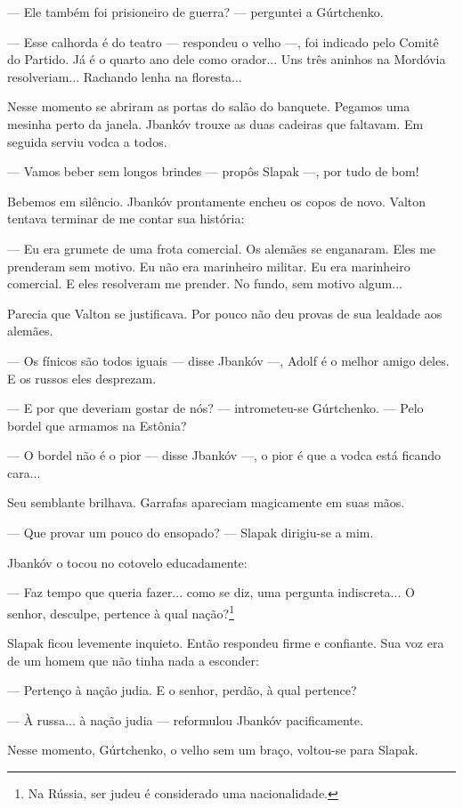 --- Ele também foi prisioneiro de guerra? --- perguntei a Gúrtchenko.

--- Esse calhorda é do teatro --- respondeu o velho ---, foi indicado
pelo Comitê do Partido. Já é o quarto ano dele como orador... Uns três
aninhos na Mordóvia resolveriam... Rachando lenha na floresta...

Nesse momento se abriram as portas do salão do banquete. Pegamos uma
mesinha perto da janela. Jbankóv trouxe as duas cadeiras que faltavam.
Em seguida serviu vodca a todos.

--- Vamos beber sem longos brindes --- propôs Slapak ---, por tudo de
bom!

Bebemos em silêncio. Jbankóv prontamente encheu os copos de novo. Valton
tentava terminar de me contar sua história:

--- Eu era grumete de uma frota comercial. Os alemães se enganaram. Eles
me prenderam sem motivo. Eu não era marinheiro militar. Eu era
marinheiro comercial. E eles resolveram me prender. No fundo, sem motivo
algum...

Parecia que Valton se justificava. Por pouco não deu provas de sua
lealdade aos alemães.

--- Os fínicos são todos iguais --- disse Jbankóv ---, Adolf é o melhor
amigo deles. E os russos eles desprezam.

--- E por que deveriam gostar de nós? --- intrometeu-se Gúrtchenko. ---
Pelo bordel que armamos na Estônia?

--- O bordel não é o pior --- disse Jbankóv ---, o pior é que a vodca
está ficando cara...

Seu semblante brilhava. Garrafas apareciam magicamente em suas mãos.

--- Que provar um pouco do ensopado? --- Slapak dirigiu-se a mim.

Jbankóv o tocou no cotovelo educadamente:

--- Faz tempo que queria fazer... como se diz, uma pergunta
indiscreta... O senhor, desculpe, pertence à qual nação?\footnote{Na
  Rússia, ser judeu é considerado uma nacionalidade.}

Slapak ficou levemente inquieto. Então respondeu firme e confiante. Sua
voz era de um homem que não tinha nada a esconder:

--- Pertenço à nação judia. E o senhor, perdão, à qual pertence?

--- À russa... à nação judia --- reformulou Jbankóv pacificamente.

Nesse momento, Gúrtchenko, o velho sem um braço, voltou-se para Slapak.

